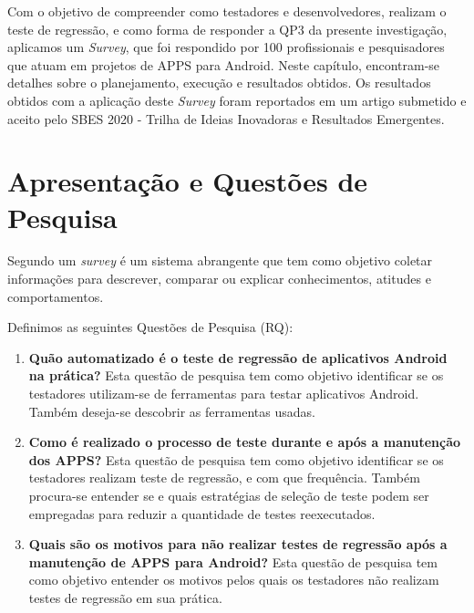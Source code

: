 
\acresetall 

Com o objetivo de compreender como testadores e desenvolvedores, realizam o teste de regressão, e como forma de responder a QP3 da presente investigação, aplicamos um \textit{Survey}, que foi respondido por 100 profissionais e pesquisadores que atuam em projetos de \ac{APPS} para Android. Neste capítulo, encontram-se detalhes sobre o planejamento, execução e resultados obtidos.
Os resultados obtidos com a aplicação deste \textit{Survey} foram reportados em um artigo submetido e aceito pelo SBES 2020 - Trilha de Ideias Inovadoras e Resultados Emergentes.


\section{Apresentação e Questões de Pesquisa}\label{rqsurvey}

Segundo \cite{PSK2001} um \textit{survey} é um sistema abrangente que tem como objetivo coletar informações para descrever, comparar ou explicar conhecimentos, atitudes e comportamentos. %

Definimos as seguintes Questões de Pesquisa (RQ):

\begin{enumerate}[label=\bf QP\arabic*,leftmargin=1.8cm]
    
    \item \textbf{Quão automatizado é o teste de regressão de aplicativos Android na prática?} Esta questão de pesquisa tem como objetivo identificar se os testadores utilizam-se de ferramentas para testar aplicativos Android. Também deseja-se descobrir as ferramentas usadas.
    
    \item \textbf{Como é realizado o processo de teste durante e após a manutenção dos \ac{APPS}?} Esta questão de pesquisa tem como objetivo identificar se os testadores realizam teste de regressão, e com que frequência. Também procura-se entender se e quais estratégias de seleção de teste podem ser empregadas para reduzir a quantidade de testes reexecutados.
    
    \item \textbf{Quais são os motivos para não realizar testes de regressão após a manutenção de \ac{APPS} para Android?} Esta questão de pesquisa tem como objetivo entender os motivos pelos quais os testadores não realizam testes de regressão em sua prática.
    
\end{enumerate}

